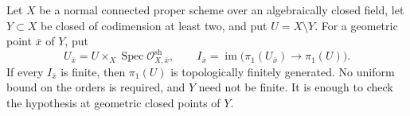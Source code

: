 \begin{proposition}
\label{D:finite-local-images-arbitrary}
Let $X$ be a normal connected proper scheme over an algebraically
closed field, let $Y\subset X$ be closed of codimension at least
two, and put $U=X\setminus Y$.  For a geometric point $\bar x$ of
$Y$, put
\[
 U_{\bar x}=U\times_X\operatorname{Spec}
                    \mathcal O^{\mathrm{sh}}_{X,\bar x},
 \qquad
 I_{\bar x}=\operatorname{im}\bigl(\pi_1(U_{\bar x})
                                  \longrightarrow\pi_1(U)\bigr).
\]
If every $I_{\bar x}$ is finite, then $\pi_1(U)$ is topologically
finitely generated.  No uniform bound on the orders is required,
and $Y$ need not be finite.  It is enough to check the hypothesis
at geometric closed points of $Y$.
\end{proposition}
